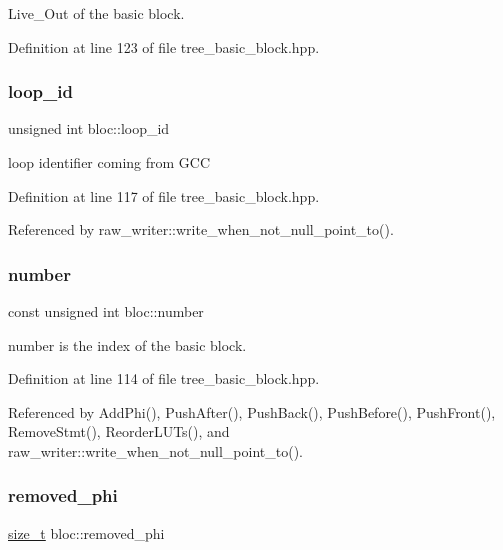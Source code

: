 Live\+\_\+\+Out of the basic block. 



Definition at line 123 of file tree\+\_\+basic\+\_\+block.\+hpp.

\mbox{\label{structbloc_abeeab411b4c5bf2af3113e61556947b4}} 
\subsubsection{\texorpdfstring{loop\+\_\+id}{loop\_id}}
{\footnotesize\ttfamily unsigned int bloc\+::loop\+\_\+id}



loop identifier coming from G\+CC 



Definition at line 117 of file tree\+\_\+basic\+\_\+block.\+hpp.



Referenced by raw\+\_\+writer\+::write\+\_\+when\+\_\+not\+\_\+null\+\_\+point\+\_\+to().

\mbox{\label{structbloc_a6a725128ee32d1236a67326b19cd2d3b}} 
\subsubsection{\texorpdfstring{number}{number}}
{\footnotesize\ttfamily const unsigned int bloc\+::number}



number is the index of the basic block. 



Definition at line 114 of file tree\+\_\+basic\+\_\+block.\+hpp.



Referenced by Add\+Phi(), Push\+After(), Push\+Back(), Push\+Before(), Push\+Front(), Remove\+Stmt(), Reorder\+L\+U\+Ts(), and raw\+\_\+writer\+::write\+\_\+when\+\_\+not\+\_\+null\+\_\+point\+\_\+to().

\mbox{\label{structbloc_a369dac24d57af8d92c3ebf14197f926f}} 
\subsubsection{\texorpdfstring{removed\+\_\+phi}{removed\_phi}}
{\footnotesize\ttfamily \hyperlink{tutorial__fpt__2017_2intro_2sixth_2test_8c_a7c94ea6f8948649f8d181ae55911eeaf}{size\+\_\+t} bloc\+::removed\+\_\+phi\hspace{0.3cm}{\ttfamily [private]}}



